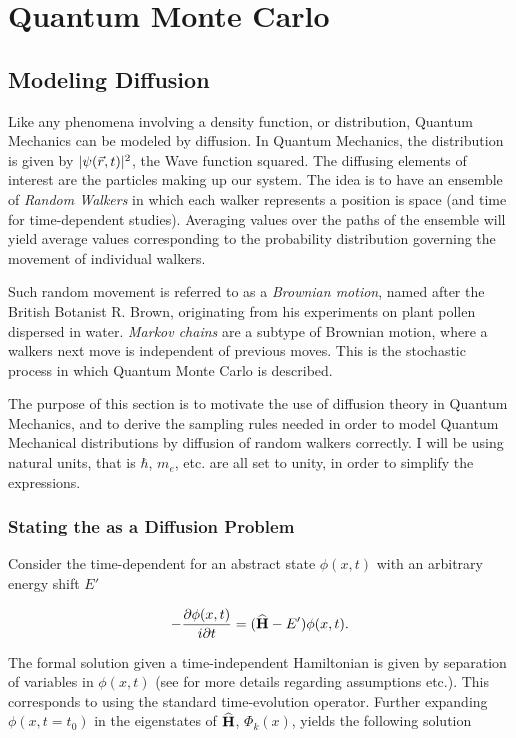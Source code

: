 \chapter{Quantum Monte Carlo}

\section{Modeling Diffusion}

Like any phenomena involving a density function, or distribution, Quantum Mechanics can be modeled by diffusion. In Quantum Mechanics, the distribution is given by $|\psi(\vec r, t)|^2$, the Wave function squared. The diffusing elements of interest are the particles making up our system. The idea is to have an ensemble of \textit{Random Walkers} in which each walker represents a position is space (and time for time-dependent studies). Averaging values over the paths of the ensemble will yield average values corresponding to the probability distribution governing the movement of individual walkers. 

Such random movement is referred to as a \textit{Brownian motion}, named after the British Botanist R. Brown, originating from his experiments on plant pollen dispersed in water. \textit{Markov chains} are a subtype of Brownian motion, where a walkers next move is independent of previous moves. This is the stochastic process in which Quantum Monte Carlo is described.

The purpose of this section is to motivate the use of diffusion theory in Quantum Mechanics, and to derive the sampling rules needed in order to model Quantum Mechanical distributions by diffusion of random walkers correctly. I will be using natural units, that is $\hbar$, $m_e$, etc. are all set to unity, in order to simplify the expressions.

\subsection{Stating the \schrodinger as a Diffusion Problem}

Consider the time-dependent \schrodinger for an abstract state $\phi(x, t)$ with an arbitrary energy shift $E'$

\begin{equation}
 -\frac{\partial \phi(x, t)}{i\partial t} = ({\bf\widehat{H}} - E')\phi(x, t).
\end{equation}

The formal solution given a time-independent Hamiltonian is given by separation of variables in $\phi(x, t)$ (see \cite{griffiths} for more details regarding assumptions etc.). This corresponds to using the standard time-evolution operator. Further expanding $\phi(x, t=t_0)$ in the eigenstates of ${\bf\widehat{H}}$, $\Phi_k(x)$, yields the following solution

